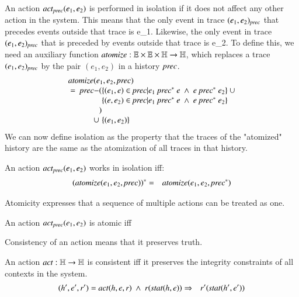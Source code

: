 \documentclass{elsarticle}
\def\id#1{\text{\em #1\/}}
\begin{document}
	An action $\id{act}_\id{prec}(e_1,e_2)$ is performed in isolation if it does not affect any other action in the system.
	This means that the only event in trace $(e_1,e_2)_\id{prec}$ that precedes events outside that trace is e_1.
	Likewise, the only event in trace $(e_1,e_2)_\id{prec}$ that is preceded by events outside that trace is e_2.
	To define this, we need an auxiliary function
	$\id{atomize}:\mathbb E\times\mathbb E\times\mathbb H\rightarrow\mathbb H$,
	which replaces a trace $(e_1,e_2)_\id{prec}$ by the pair $(e_1,e_2)$
	in a history $\id{prec}$.
\begin{eqnarray}
	\begin{array}[t]{r@{}l@{}l}
	\multicolumn{3}{l}{\id{atomize}(e_1,e_2,\id{prec})}\\
	   \ =\ \id{prec}-&(&\{ (e_1,e)\in\id{prec}| e_1\ \id{prec}^*\ e\ \wedge\ e\ \id{prec}^*\ e_2\}\ \cup\\
			  & &\{ (e,e_2)\in\id{prec}| e_1\ \id{prec}^*\ e\ \wedge\ e\ \id{prec}^*\ e_2\}\\
			  &)\\
		\cup&&\{ (e_1,e_2) \}\\
	\end{array}
\end{eqnarray}
	We can now define isolation as the property that the traces of the "atomized" history
	are the same as the atomization of all traces in that history.
\begin{definition}[Isolation]
\item An action $\id{act}_{\id{prec}}(e_1,e_2)$ works in isolation iff:
\label{def:Isolation}
\begin{eqnarray}
	(\id{atomize}(e_1,e_2,\id{prec}))^*&=&\id{atomize}(e_1,e_2,\id{prec}^*)
\end{eqnarray}
\end{definition}

	Atomicity expresses that a sequence of multiple actions can be treated as one.

\begin{definition}[Atomic]
\item An action $\id{act}_{\id{prec}}(e_1,e_2)$ is atomic iff
\label{def:Atomicity}
\end{definition}

	Consistency of an action means that it preserves truth.
\begin{definition}[Consistency]
\item An action $\id{act}:\mathbb H\rightarrow\mathbb H$ is consistent iff it preserves the integrity constraints of all contexts in the system.
\label{def:Consistency}
\begin{eqnarray}
	(h',e',r')=\id{act}(h,e,r)\ \wedge\ r(\id{stat}(h,e))&\Rightarrow&r'(\id{stat}(h',e'))
\end{eqnarray}
\end{definition}
\end{document}
